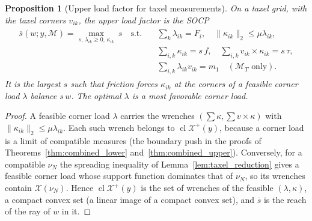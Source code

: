 \documentclass[11pt,a4paper]{article}
\theoremstyle{plain}
\newtheorem{proposition}[theorem]{Proposition}
\newcommand{\X}{\mathcal X}
\begin{document}
\begin{proposition}[Upper load factor for taxel measurements]
\label{prop:load_factor_upper}
    On a taxel grid, with the taxel corners $v_{ik}$, the upper load factor is the SOCP
    \begin{align}
        \boxed{
        \begin{aligned}
        \overline s(w;y,\mathcal M)=\max_{s,\,\lambda_{ik}\ge0,\,\kappa_{ik}}\ s\quad\text{s.t.}\quad
        &\textstyle\sum_k\lambda_{ik}=F_i,\quad\|\kappa_{ik}\|_2\le\mu\lambda_{ik},\\
        &\textstyle\sum_{i,k}\kappa_{ik}=s\,f,\quad\sum_{i,k}v_{ik}\times\kappa_{ik}=s\,\tau,\\
        &\textstyle\sum_{i,k}\lambda_{ik}v_{ik}=m_1\quad(\mathcal M_T\text{ only}).
        \end{aligned}}
    \end{align}
    It is the largest $s$ such that friction forces $\kappa_{ik}$ at the corners of a feasible corner load $\lambda$ balance $s\,w$. The optimal $\lambda$ is a most favorable corner load.
\end{proposition}
\begin{proof}
    A feasible corner load $\lambda$ carries the wrenches $(\sum\kappa,\sum v\times\kappa)$ with $\|\kappa_{ik}\|_2\le\mu\lambda_{ik}$. Each such wrench belongs to $\operatorname{cl}\X^+(y)$, because a corner load is a limit of compatible
    measures (the boundary push in the proofs of Theorems~\ref{thm:combined_lower} and~\ref{thm:combined_upper}). Conversely, for a compatible $\nu_N$ the spreading inequality of Lemma~\ref{lem:taxel_reduction} gives
    a feasible corner load whose support function dominates that of $\nu_N$, so its wrenches contain $\X(\nu_N)$. Hence $\operatorname{cl}\X^+(y)$ is the set of wrenches of the feasible $(\lambda,\kappa)$, a compact convex set
    (a linear image of a compact convex set), and $\overline s$ is the reach of the ray of $w$ in it.
\end{proof}

\end{document}
